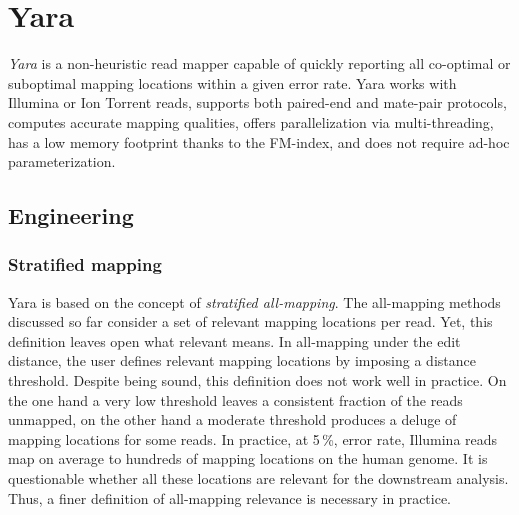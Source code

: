\chapter{Yara}
\label{sec:yara}

\emph{Yara} is a non-heuristic read mapper capable of quickly reporting all co-optimal or suboptimal mapping locations within a given error rate.
Yara works with Illumina or Ion Torrent reads, supports both paired-end and mate-pair protocols, computes accurate mapping qualities, offers parallelization via multi-threading, has a low memory footprint thanks to the FM-index, and does not require ad-hoc parameterization.


\section{Engineering}
\label{sec:yara:eng}

\subsection{Stratified mapping}
\label{sec:yara:eng:strata}

Yara is based on the concept of \emph{stratified all-mapping}.
The all-mapping methods discussed so far consider a set of relevant mapping locations per read.
Yet, this definition leaves open what relevant means.
In all-mapping under the edit distance, the user defines relevant mapping locations by imposing a distance threshold.
Despite being sound, this definition does not work well in practice.
On the one hand a very low threshold leaves a consistent fraction of the reads unmapped, on the other hand a moderate threshold produces a deluge of mapping locations for some reads.
In practice, at 5\,\%, error rate, Illumina reads map on average to hundreds of mapping locations on the human genome.
It is questionable whether all these locations are relevant for the downstream analysis.
Thus, a finer definition of all-mapping relevance is necessary in practice.



